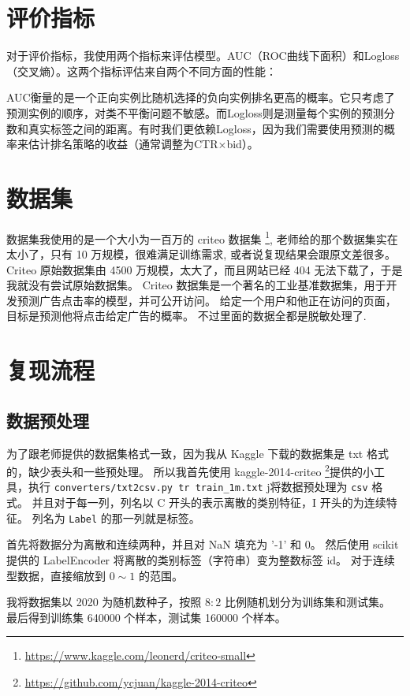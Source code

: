 \documentclass[degree=project,degree-type=project,cjk-font=noto]{thuthesis}
\begin{document}
\chapter{评价指标}

对于评价指标，我使用两个指标来评估模型。AUC（ROC曲线下面积）和Logloss（交叉熵）。这两个指标评估来自两个不同方面的性能：

AUC衡量的是一个正向实例比随机选择的负向实例排名更高的概率。它只考虑了预测实例的顺序，对类不平衡问题不敏感。而Logloss则是测量每个实例的预测分数和真实标签之间的距离。有时我们更依赖Logloss，因为我们需要使用预测的概率来估计排名策略的收益（通常调整为CTR×bid）。

\chapter{数据集}

数据集我使用的是一个大小为一百万的 criteo 数据集 \footnote{\url{https://www.kaggle.com/leonerd/criteo-small}}, 老师给的那个数据集实在太小了，只有 10 万规模，很难满足训练需求, 或者说复现结果会跟原文差很多。
Criteo 原始数据集由 4500 万规模，太大了，而且网站已经 404 无法下载了，于是我就没有尝试原始数据集。
Criteo 数据集是一个著名的工业基准数据集，用于开发预测广告点击率的模型，并可公开访问。 给定一个用户和他正在访问的页面，目标是预测他将点击给定广告的概率。
不过里面的数据全都是脱敏处理了.


\chapter{复现流程}

\section{数据预处理}

为了跟老师提供的数据集格式一致，因为我从 Kaggle 下载的数据集是 txt 格式的，缺少表头和一些预处理。
所以我首先使用 kaggle-2014-criteo \footnote{\url{https://github.com/ycjuan/kaggle-2014-criteo}}提供的小工具，执行 \texttt{converters/txt2csv.py tr train\_1m.txt} j将数据预处理为 \texttt{csv} 格式。
并且对于每一列，列名以 C 开头的表示离散的类别特征，I 开头的为连续特征。
列名为 \texttt{Label} 的那一列就是标签。

首先将数据分为离散和连续两种，并且对 NaN 填充为 '-1' 和 0。
然后使用 scikit 提供的 LabelEncoder 将离散的类别标签（字符串）变为整数标签 id。
对于连续型数据，直接缩放到 $0 \sim 1$ 的范围。

我将数据集以 2020 为随机数种子，按照 $8 : 2$ 比例随机划分为训练集和测试集。
最后得到训练集 640000 个样本，测试集 160000 个样本。
\end{document}
